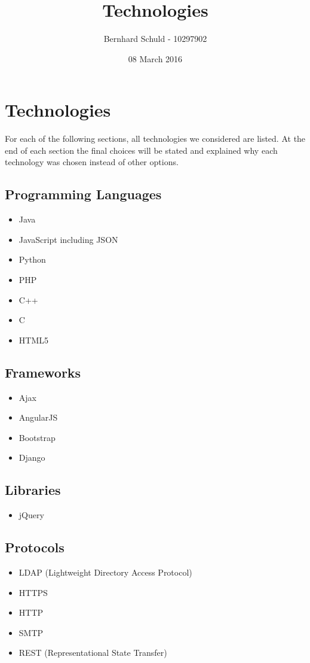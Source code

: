 \documentclass[12pt, letterpaper, twoside]{article}
\title{Technologies}
\author{Bernhard Schuld - 10297902}
\date{08 March 2016}
\begin{document}
\section{Technologies}

	For each of the following sections, all technologies we considered are listed. At the end of each section the final choices will be stated and explained why each technology was chosen instead of other options.
	
	\subsection{Programming Languages}
		\begin{itemize}
			\item Java
			\item JavaScript including JSON
			\item Python
			\item PHP
			\item C++
			\item C
			\item HTML5 %
		\end{itemize}
		
	\subsection{Frameworks}
		\begin{itemize}
			\item Ajax 
			\item AngularJS 
			\item Bootstrap 
			\item Django
		\end{itemize}

	\subsection{Libraries}
		\begin{itemize}	
			\item jQuery
		\end{itemize}
	
	\subsection{Protocols}
		\begin{itemize}	
			\item LDAP (Lightweight Directory Access Protocol)
			\item HTTPS
			\item HTTP
			\item SMTP
			\item REST (Representational State Transfer)
		\end{itemize}
	
\end{document}
